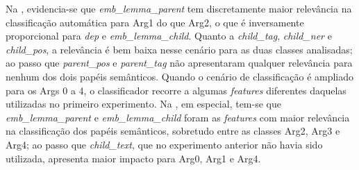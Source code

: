 Na , evidencia-se que \emph{emb\_lemma\_parent} tem
discretamente maior relevância na classificação automática para Arg1 do
que Arg2, o que é inversamente proporcional para \emph{dep} e
\emph{emb\_lemma\_child}. Quanto a \emph{child\_tag}, \emph{child\_ner}
e \emph{child\_pos}, a relevância é bem baixa nesse cenário para as duas
classes analisadas; ao passo que \emph{parent\_pos} e \emph{parent\_tag}
não apresentaram qualquer relevância para nenhum dos dois papéis
semânticos. Quando o cenário de classificação é ampliado para os Args 0
a 4, o classificador recorre a algumas \emph{features} diferentes
daquelas utilizadas no primeiro experimento. Na , em especial,
tem-se que \emph{emb\_lemma\_parent} e \emph{emb\_lemma\_child} foram as
\emph{features} com maior relevância na classificação dos papéis
semânticos, sobretudo entre as classes Arg2, Arg3 e Arg4; ao passo que
\emph{child\_text}, que no experimento anterior não havia sido
utilizada, apresenta maior impacto para Arg0, Arg1 e Arg4.